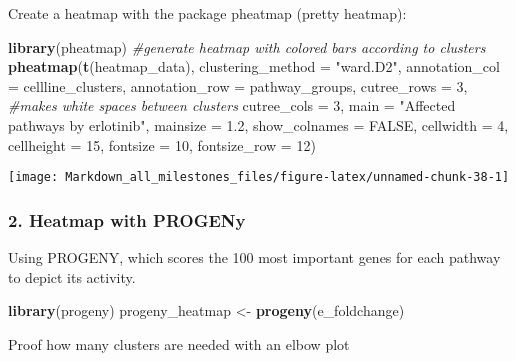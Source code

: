 \documentclass[]{article}
\newenvironment{Shaded}{\begin{snugshade}}{\end{snugshade}}
\newcommand{\CommentTok}[1]{\textcolor[rgb]{0.56,0.35,0.01}{\textit{#1}}}
\newcommand{\DataTypeTok}[1]{\textcolor[rgb]{0.13,0.29,0.53}{#1}}
\newcommand{\DecValTok}[1]{\textcolor[rgb]{0.00,0.00,0.81}{#1}}
\newcommand{\FloatTok}[1]{\textcolor[rgb]{0.00,0.00,0.81}{#1}}
\newcommand{\KeywordTok}[1]{\textcolor[rgb]{0.13,0.29,0.53}{\textbf{#1}}}
\newcommand{\NormalTok}[1]{#1}
\newcommand{\OtherTok}[1]{\textcolor[rgb]{0.56,0.35,0.01}{#1}}
\newcommand{\StringTok}[1]{\textcolor[rgb]{0.31,0.60,0.02}{#1}}
\begin{document}
Create a heatmap with the package pheatmap (pretty heatmap):

\begin{Shaded}
\begin{Highlighting}[]
\KeywordTok{library}\NormalTok{(pheatmap)}
\CommentTok{#generate heatmap with colored bars according to clusters}
\KeywordTok{pheatmap}\NormalTok{(}\KeywordTok{t}\NormalTok{(heatmap_data),}
         \DataTypeTok{clustering_method =} \StringTok{"ward.D2"}\NormalTok{,}
         \DataTypeTok{annotation_col =}\NormalTok{ cellline_clusters,}
         \DataTypeTok{annotation_row =}\NormalTok{ pathway_groups,}
         \DataTypeTok{cutree_rows =} \DecValTok{3}\NormalTok{, }\CommentTok{#makes white spaces between clusters}
         \DataTypeTok{cutree_cols =} \DecValTok{3}\NormalTok{,}
         \DataTypeTok{main =} \StringTok{"Affected pathways by erlotinib"}\NormalTok{,}
         \DataTypeTok{mainsize =} \FloatTok{1.2}\NormalTok{,}
         \DataTypeTok{show_colnames =} \OtherTok{FALSE}\NormalTok{,}
         \DataTypeTok{cellwidth =} \DecValTok{4}\NormalTok{,}
         \DataTypeTok{cellheight =} \DecValTok{15}\NormalTok{, }
         \DataTypeTok{fontsize =} \DecValTok{10}\NormalTok{,}
         \DataTypeTok{fontsize_row =} \DecValTok{12}\NormalTok{)}
\end{Highlighting}
\end{Shaded}

\begin{center}\texttt{[image: Markdown\_all\_milestones\_files/figure-latex/unnamed-chunk-38-1]} \end{center}

\hypertarget{heatmap-with-progeny}{%
\subsubsection{2. Heatmap with PROGENy}\label{heatmap-with-progeny}}

Using PROGENY, which scores the 100 most important genes for each
pathway to depict its activity.

\begin{Shaded}
\begin{Highlighting}[]
\KeywordTok{library}\NormalTok{(progeny)}
\NormalTok{progeny_heatmap <-}\StringTok{ }\KeywordTok{progeny}\NormalTok{(e_foldchange)}
\end{Highlighting}
\end{Shaded}

Proof how many clusters are needed with an elbow plot
\end{document}
